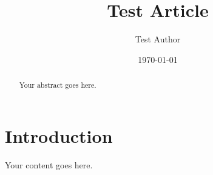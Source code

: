 \documentclass{article}
\title{Test Article}
\author{Test Author}
\date{\today}
\begin{document}
\maketitle

\begin{abstract}
Your abstract goes here.
\end{abstract}

\section{Introduction}

Your content goes here.
\end{document}
